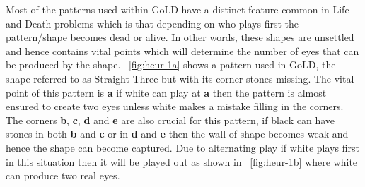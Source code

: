 \documentclass{l4proj}
\newcommand{\bo}[1]{\textbf{#1}}
\begin{document}
Most of the patterns used within GoLD have a distinct feature common in Life and Death problems which is that depending on who plays first the pattern/shape becomes dead or alive. In other words, these shapes are unsettled and hence contains vital points which will determine the number of eyes that can be produced by the shape. ~\autoref{fig:heur-1a} shows a pattern used in GoLD, the shape referred to as Straight Three but with its corner stones missing. The vital point of this pattern is \bo{a} if white can play at \bo{a} then the pattern is almost ensured to create two eyes unless white makes a mistake filling in the corners. The corners \bo{b}, \bo{c}, \bo{d} and \bo{e} are also crucial for this pattern, if black can have stones in both \bo{b} and \bo{c}  or  in \bo{d} and \bo{e} then the wall of shape becomes weak and hence the shape can become captured. Due to alternating play if white plays first in this situation then it will be played out as shown in ~\autoref{fig:heur-1b} where white can produce two real eyes.
\end{document}
